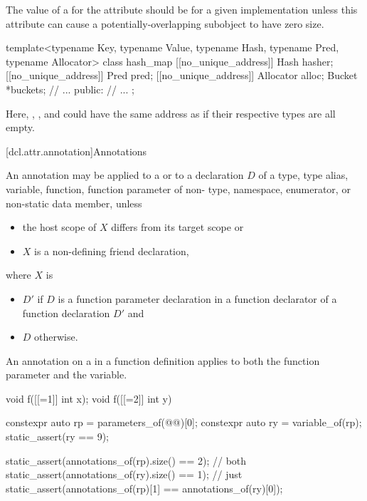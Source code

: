 \recommended
The value of a 
for the  attribute
should be  for a given implementation
unless this attribute can cause a potentially-overlapping subobject
to have zero size.

\begin{example}
\begin{codeblock}
template<typename Key, typename Value,
         typename Hash, typename Pred, typename Allocator>
class hash_map {
  [[no_unique_address]] Hash hasher;
  [[no_unique_address]] Pred pred;
  [[no_unique_address]] Allocator alloc;
  Bucket *buckets;
  // ...
public:
  // ...
};
\end{codeblock}
Here, , , and 
could have the same address as 
if their respective types are all empty.
\end{example}

[dcl.attr.annotation]{Annotations}%

\pnum
An annotation may be applied
to a  or
to a declaration $D$ of a
type,
type alias,
variable,
function,
function parameter of non- type,
namespace,
enumerator, or
non-static data member,
unless
\begin{itemize}
\item the host scope of $X$ differs from its target scope or
\item $X$ is a non-defining friend declaration,
\end{itemize}
where $X$ is
\begin{itemize}
\item
$D'$ if $D$ is a function parameter declaration in
a function declarator of a function declaration $D'$ and
\item $D$ otherwise.
\end{itemize}
\begin{note}
An annotation on a  in a function definition
applies to both the function parameter and the variable.
\begin{example}
\begin{codeblock}
void f([[=1]] int x);
void f([[=2]] int y) {
  constexpr auto rp = parameters_of(@@)[0];
  constexpr auto ry = variable_of(rp);
  static_assert(ry == ^^y);

  static_assert(annotations_of(rp).size() == 2);    // both \tcode{[1, 2]}
  static_assert(annotations_of(ry).size() == 1);    // just \tcode{[2]}
  static_assert(annotations_of(rp)[1] == annotations_of(ry)[0]);
}
\end{codeblock}
\end{example}
\end{note}

